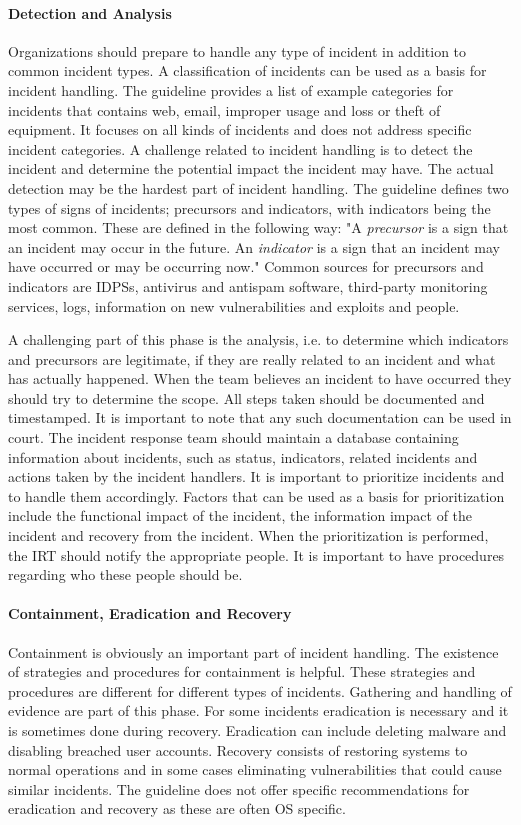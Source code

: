 \paragraph{Detection and Analysis}
Organizations should prepare to handle any type of incident in addition to common incident types. A classification of incidents can be used as a basis for incident handling. The guideline provides a list of example categories for incidents that contains web, email, improper usage and loss or theft of equipment. It focuses on all kinds of incidents and does not address specific incident categories. A challenge related to incident handling is to detect the incident and determine the potential impact the incident may have. The actual detection may be the hardest part of incident handling. The guideline defines two types of signs of incidents; precursors and indicators, with indicators being the most common. These are defined in the following way: "A \emph{precursor} is a sign that an incident may occur in the future. An \emph{indicator} is a sign that an incident may have occurred or may be occurring now." Common sources for precursors and indicators are \acp{IDPS}, antivirus and antispam software, third-party monitoring services, logs, information on new vulnerabilities and exploits and people. 

A challenging part of this phase is the analysis, i.e. to determine which indicators and precursors are legitimate, if they are really related to an incident and what has actually happened. When the team believes an incident to have occurred they should try to determine the scope. All steps taken should be documented and timestamped. It is important to note that any such documentation can be used in court. The incident response team should maintain a database containing information about incidents, such as status, indicators, related incidents and actions taken by the incident handlers. It is important to prioritize incidents and to handle them accordingly. Factors that can be used as a basis for prioritization include the functional impact of the incident, the information impact of the incident and recovery from the incident. When the prioritization is performed, the \ac{IRT} should notify the appropriate people. It is important to have procedures regarding who these people should be.

\paragraph{Containment, Eradication and Recovery}
Containment is obviously an important part of incident handling. The existence of strategies and procedures for containment is helpful. These strategies and procedures are different for different types of incidents. Gathering and handling of evidence are part of this phase. For some incidents eradication is necessary and it is sometimes done during recovery. Eradication can include deleting malware and disabling breached user accounts. Recovery consists of restoring systems to normal operations and in some cases eliminating vulnerabilities that could cause similar incidents. The guideline does not offer specific recommendations for eradication and recovery as these are often OS specific. 

